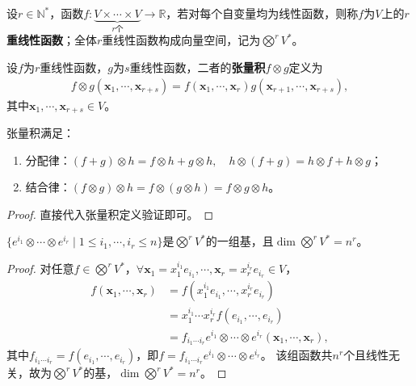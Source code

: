 \documentclass[../../main.tex]{subfiles}%
\begin{document}
\begin{definition}
设$r\in\mathbb{N}^*$，函数$f:\underbrace{V\times\cdots\times V}_{r\text{个}}\to\mathbb{R}$，若对每个自变量均为线性函数，则称$f$为$V$上的\textbf{$r$重线性函数}；全体$r$重线性函数构成向量空间，记为$\bigotimes^r V^*$。
\end{definition}

\begin{definition}
设$f$为$r$重线性函数，$g$为$s$重线性函数，二者的\textbf{张量积}$f\otimes g$定义为
\begin{align}
f\otimes g(\boldsymbol{x}_1,\cdots,\boldsymbol{x}_{r+s})=f(\boldsymbol{x}_1,\cdots,\boldsymbol{x}_r)g(\boldsymbol{x}_{r+1},\cdots,\boldsymbol{x}_{r+s}),
\label{eq:tensor_product}
\end{align}
其中$\boldsymbol{x}_1,\cdots,\boldsymbol{x}_{r+s}\in V$。
\end{definition}

\begin{proposition}
张量积满足：
\begin{enumerate}[(1)]
\item 分配律：$(f+g)\otimes h=f\otimes h+g\otimes h,\quad h\otimes(f+g)=h\otimes f+h\otimes g$；
\item 结合律：$(f\otimes g)\otimes h=f\otimes(g\otimes h)=f\otimes g\otimes h$。
\end{enumerate}
\end{proposition}
\begin{proof}
直接代入张量积定义验证即可。
\end{proof}

\begin{proposition}
$\{e^{i_1}\otimes\cdots\otimes e^{i_r}\mid 1\leqslant i_1,\cdots,i_r\leqslant n\}$是$\bigotimes^r V^*$的一组基，且$\dim\bigotimes^r V^*=n^r$。
\end{proposition}
\begin{proof}
对任意$f\in\bigotimes^r V^*$，$\forall\boldsymbol{x}_1=x_1^{i_1}e_{i_1},\cdots,\boldsymbol{x}_r=x_r^{i_r}e_{i_r}\in V$，
\begin{align*}
f(\boldsymbol{x}_1,\cdots,\boldsymbol{x}_r)&=f(x_1^{i_1}e_{i_1},\cdots,x_r^{i_r}e_{i_r})\\
&=x_1^{i_1}\cdots x_r^{i_r}f(e_{i_1},\cdots,e_{i_r})\\
&=f_{i_1\cdots i_r}e^{i_1}\otimes\cdots\otimes e^{i_r}(\boldsymbol{x}_1,\cdots,\boldsymbol{x}_r),
\end{align*}
其中$f_{i_1\cdots i_r}=f(e_{i_1},\cdots,e_{i_r})$，即$f=f_{i_1\cdots i_r}e^{i_1}\otimes\cdots\otimes e^{i_r}$。
该组函数共$n^r$个且线性无关，故为$\bigotimes^r V^*$的基，$\dim\bigotimes^r V^*=n^r$。
\end{proof}
\end{document}
